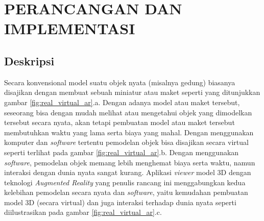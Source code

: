 
\chapter{PERANCANGAN DAN IMPLEMENTASI}
\label{chap:perancangan}
\section {Deskripsi}
\label{sec:gambaran_aplikasi}
Secara konvensional model suatu objek nyata (misalnya gedung) biasanya disajikan dengan membuat sebuah  miniatur atau maket seperti yang ditunjukkan gambar \ref{fig:real_virtual_ar}.a. Dengan adanya model atau maket tersebut, seseorang bisa dengan mudah melihat atau mengetahui objek yang dimodelkan tersebut secara nyata, akan tetapi pembuatan model atau maket tersebut membutuhkan waktu yang lama serta biaya yang mahal. Dengan menggunakan komputer dan \textit{software} tertentu pemodelan objek bisa disajikan secara virtual seperti terlihat pada gambar \ref{fig:real_virtual_ar}.b. Dengan menggunakan \textit{software}, pemodelan objek memang lebih menghemat biaya serta waktu, namun interaksi dengan dunia nyata sangat kurang. Aplikasi \textit{viewer} model 3D  dengan teknologi \textit{Augmented Reality} yang penulis rancang ini menggabungkan kedua kelebihan pemodelan secara nyata dan \textit{software}, yaitu kemudahan pembuatan model 3D (secara virtual) dan juga interaksi terhadap dunia nyata seperti diilustrasikan pada gambar \ref{fig:real_virtual_ar}.c.

